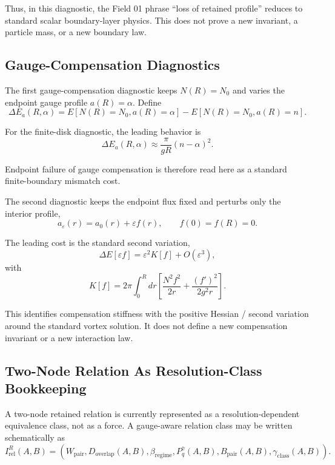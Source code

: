 \documentclass[11pt,a4paper]{article}
\begin{document}
Thus, in this diagnostic, the Field 01 phrase ``loss of retained profile'' reduces to standard scalar boundary-layer physics. This does not prove a new invariant, a particle mass, or a new boundary law.

\subsection{Gauge-Compensation Diagnostics}

The first gauge-compensation diagnostic keeps $N(R)=N_0$ and varies the endpoint gauge profile $a(R)=\alpha$. Define
\begin{equation}
\Delta E_a(R,\alpha)
=E[N(R)=N_0,a(R)=\alpha]-E[N(R)=N_0,a(R)=n].
\end{equation}

For the finite-disk diagnostic, the leading behavior is
\begin{equation}
\Delta E_a(R,\alpha)
\approx \frac{\pi}{gR}(n-\alpha)^2.
\end{equation}

Endpoint failure of gauge compensation is therefore read here as a standard finite-boundary mismatch cost.

The second diagnostic keeps the endpoint flux fixed and perturbs only the interior profile,
\begin{equation}
a_\varepsilon(r)=a_0(r)+\varepsilon f(r),
\qquad
f(0)=f(R)=0.
\end{equation}

The leading cost is the standard second variation,
\begin{equation}
\Delta E[\varepsilon f]
=\varepsilon^2 K[f]+O(\varepsilon^3),
\end{equation}
with
\begin{equation}
K[f]
=2\pi\int_0^R dr\left[
\frac{N^2f^2}{2r}
+\frac{(f')^2}{2g^2r}
\right].
\end{equation}

This identifies compensation stiffness with the positive Hessian / second variation around the standard vortex solution. It does not define a new compensation invariant or a new interaction law.

\subsection{Two-Node Relation As Resolution-Class Bookkeeping}

A two-node retained relation is currently represented as a resolution-dependent equivalence class, not as a force. A gauge-aware relation class may be written schematically as
\begin{equation}
I_{\mathrm{rel}}^{R}(A,B)=
\left(
W_{\mathrm{pair}},
D_{\mathrm{overlap}}(A,B),
\beta_{\mathrm{regime}},
P_q^\gamma(A,B),
B_{\mathrm{pair}}(A,B),
\gamma_{\mathrm{class}}(A,B)
\right).
\end{equation}
\end{document}
